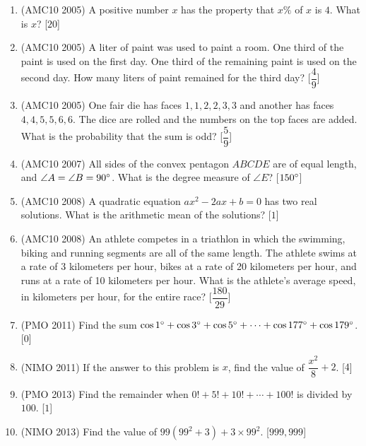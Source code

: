 \documentclass[11pt,paper=letter]{scrartcl}
\begin{document}
\begin{enumerate}

\item (AMC10 2005) A positive number $x$ has the property that $x\%$ of $x$ is $4$. What is $x$? \hfill [$20$]

\item (AMC10 2005) A liter of paint was used to paint a room. One third of the paint is used on the first day. One third of the remaining paint is used on the second day. How many liters of paint remained for the third day? \hfill [$\dfrac{4}{9}$]

\item (AMC10 2005) One fair die has faces $1, 1, 2, 2, 3, 3$ and another has faces $4, 4, 5, 5, 6, 6$. The dice are rolled and the numbers on the top faces are added. What is the probability that the sum is odd? \hfill [$\dfrac{5}{9}$]

\item (AMC10 2007) All sides of the convex pentagon $ABCDE$ are of equal length, and $\angle A = \angle B = 90^\circ$. What is the degree measure of $\angle E$? \hfill [$150^\circ$]

\item (AMC10 2008) A quadratic equation $ax^2 - 2ax + b = 0$ has two real solutions. What is the arithmetic mean of the solutions? \hfill [$1$]

\item (AMC10 2008) An athlete competes in a triathlon in which the swimming, biking and running segments are all of the same length. The athlete swims at a rate of 3 kilometers per hour, bikes at a rate of 20 kilometers per hour, and runs at a rate of 10 kilometers per hour. What is the athlete's average speed, in kilometers per hour, for the entire race? \hfill [$\dfrac{180}{29}$]

\item (PMO 2011) Find the sum $\cos 1^\circ + \cos 3^\circ + \cos 5^\circ + \cdots + \cos 177^\circ + \cos 179^\circ$. \hfill [$0$]

\item (NIMO 2011) If the answer to this problem is $x$, find the value of $\dfrac{x^2}{8} + 2$. \hfill [$4$]

\item (PMO 2013) Find the remainder when $0! + 5! + 10! + \cdots + 100!$ is divided by $100$. \hfill [$1$]

\item (NIMO 2013) Find the value of $99(99^2 + 3) + 3 \times 99^2$. \hfill [$999,999$]


\end{enumerate}
\end{document}
